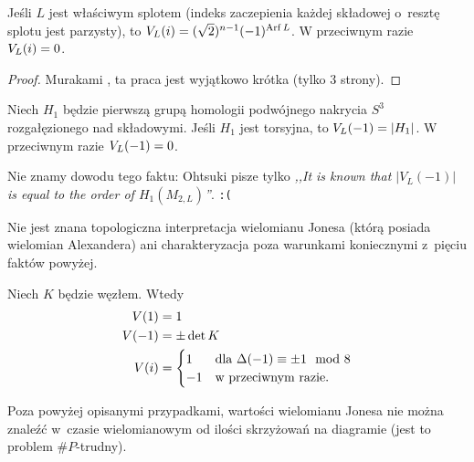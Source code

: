 \begin{proposition}
    Jeśli $L$ jest właściwym splotem (indeks zaczepienia każdej składowej o~resztę splotu jest parzysty), to $V_L(i) = (\sqrt 2)^{n-1}(-1)^{\operatorname{Arf} L}$.
    W przeciwnym razie $V_L(i) = 0$.
\end{proposition}

\begin{proof}
%
    Murakami \cite{murakami86}, ta praca jest wyjątkowo krótka (tylko 3 strony).
\end{proof}

\begin{proposition}
    Niech $H_1$ będzie pierwszą grupą homologii podwójnego nakrycia $S^3$ rozgałęzionego nad składowymi.
    Jeśli $H_1$ jest torsyjna, to $V_L(-1) = |H_1|$.
    W przeciwnym razie $V_L(-1) = 0$.
\end{proposition}

Nie znamy dowodu tego faktu: Ohtsuki \cite[s. 383]{ohtsuki02} pisze tylko \emph{,,It is known that $|V_L(-1)|$ is equal to the order of $H_1(M_{2,L})$''}. \hfill \texttt{:(}

Nie jest znana topologiczna interpretacja wielomianu Jonesa (którą posiada wielomian Alexandera) ani charakteryzacja poza warunkami koniecznymi z~pięciu faktów powyżej.

\begin{corollary}
    Niech $K$ będzie węzłem.
    Wtedy
    \begin{align}
        V(1) & = 1 \\
        V(-1) & = \pm \det K \\
        V(i) & = \begin{cases}
            1 & \text{dla } \Delta(-1) \equiv \pm 1 \mod 8 \\
            -1 & \text{w przeciwnym razie.}
        \end{cases}
    \end{align}
\end{corollary}

Poza powyżej opisanymi przypadkami, wartości wielomianu Jonesa nie można znaleźć w~czasie wielomianowym od ilości skrzyżowań na diagramie (jest to problem $\#P$-trudny).




